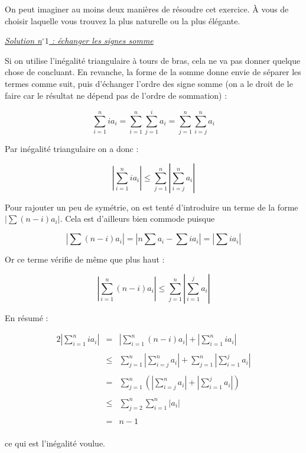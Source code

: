\begin{sol}
On peut imaginer au moins deux manières de résoudre cet exercice. À vous de choisir laquelle vous trouvez la plus naturelle ou la plus élégante.

\underline{\textit{Solution n$^\circ 1$ : échanger les signes somme}}

Si on utilise l'inégalité triangulaire à tours de bras, cela ne va pas donner quelque chose de concluant. En revanche, la forme de la somme donne envie de séparer les termes comme suit, puis d'échanger l'ordre des signe somme (on a le droit de le faire car le résultat ne dépend pas de l'ordre de sommation) : 

\[
\sum_{i=1}^{n} ia_i = \sum_{i=1}^n \sum_{j=1}^i a_i = \sum_{j=1}^n \sum_{i=j}^n a_i
\]

Par inégalité triangulaire on a donc : 

\[\left| \sum_{i=1}^{n} ia_i \right| \leqslant \sum_{j=1}^n \left|\sum_{i=j}^n a_i\right|\]

Pour rajouter un peu de symétrie, on est tenté d'introduire un terme de la forme $|\sum (n-i)a_i|$. Cela est d'ailleurs bien commode puisque 

\[|\sum (n-i)a_i| = |n\sum a_i - \sum ia_i| = |\sum ia_i|\] 

Or ce terme vérifie de même que plus haut : 

\[\left|\sum_{i=1}^n (n-i)a_i\right| \leqslant \sum_{j=1}^n \left|\sum_{i=1}^j a_i \right|\]

En résumé : 

\[\begin{array}{lll}
\displaystyle 2 \left| \sum_{i=1}^{n} ia_i \right|
&=&\displaystyle \left| \sum_{i=1}^{n} (n-i)a_i \right|+\left| \sum_{i=1}^{n} ia_i \right| \\
&&\\
& \leqslant & \displaystyle\sum_{j=1}^n \left|\sum_{i=j}^n a_i\right| + \sum_{j=1}^n \left|\sum_{i=1}^j a_i \right| \\
&&\\
&=& \displaystyle\sum_{j=1}^n \left(\left|\sum_{i=j}^n a_i\right|+\left|\sum_{i=1}^j a_i \right|\right) \\
&&\\
&\leqslant & \displaystyle\sum_{j=2}^n \sum_{i=1}^n |a_i|\\
&&\\
&=&n-1\\ 
\end{array}\]

ce qui est l'inégalité voulue. 


\end{sol}

